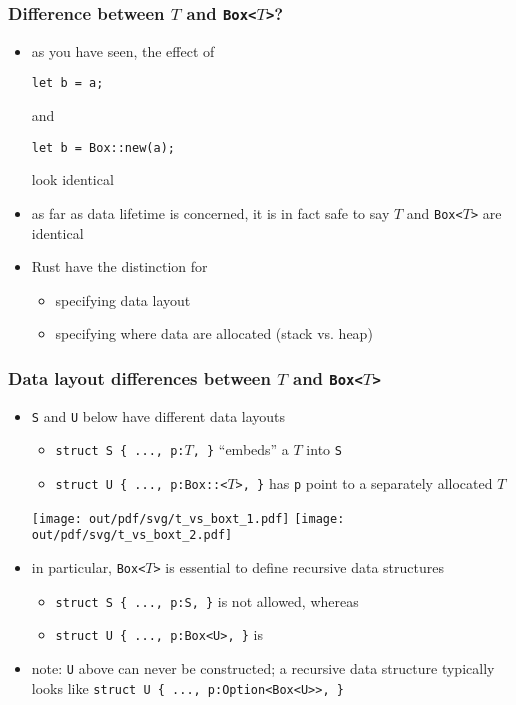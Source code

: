 \documentclass[12pt,dvipdfmx]{beamer}
\newcommand{\mura}[1]{{\color{purple}#1}}
\newcommand{\ao}[1]{{\color{blue}#1}}
\begin{document}
\begin{frame}[fragile]
  \frametitle{Difference between $T$ and {\tt Box<$T$>}?}
  \begin{itemize}
  \item as you have seen, the effect of
\begin{lstlisting}
let b = a;      
\end{lstlisting}
and
\begin{lstlisting}
let b = Box::new(a);
\end{lstlisting}
look identical
    
\item as far as data lifetime is concerned,
  it is in fact safe to say \mura{$T$} and \mura{\tt Box<$T$>}
  are identical
  
\item Rust have the distinction for
  \begin{itemize}
  \item specifying data layout
  \item specifying where data are allocated (stack vs. heap)
  \end{itemize}
\end{itemize}
\end{frame}
    
\begin{frame}
  \frametitle{Data layout differences between $T$ and {\tt Box<$T$>}}
  \begin{itemize}
  \item {\tt S} and {\tt U} below have different data layouts
    \begin{itemize}
    \item {\tt struct S \{ ..., p:\ao{$T$}, \}} ``embeds'' a $T$ into {\tt S}
    \item {\tt struct U \{ ..., p:\mura{Box::<$T$>}, \}}
      has {\tt p} point to a separately allocated $T$
    \end{itemize}

    \begin{center}
      \texttt{[image: out/pdf/svg/t\_vs\_boxt\_1.pdf]}
      \hspace{1cm}
      \texttt{[image: out/pdf/svg/t\_vs\_boxt\_2.pdf]}
    \end{center}
    
  \item in particular, {\tt Box<$T$>} is essential to define recursive data structures
    \begin{itemize}
    \item {\tt struct S \{ ..., p:\ao{S}, \}} is not allowed, whereas
    \item {\tt struct U \{ ..., p:\mura{Box<U>}, \}} is
    \end{itemize}
  \item note: {\tt U} above can never be constructed; a recursive data
    structure typically looks like
    {\tt struct U \{ ..., p:\mura{Option<Box<U>>}, \}}
  \end{itemize}
\end{frame}
\end{document}
